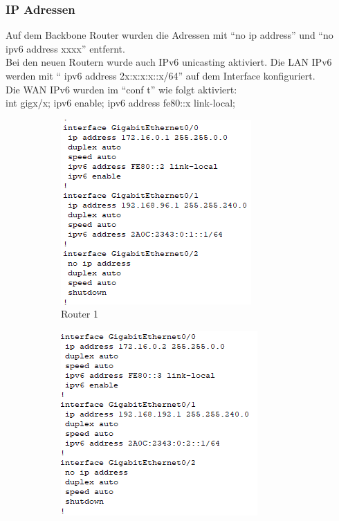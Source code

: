 \subsubsection{IP Adressen}
Auf dem Backbone Router wurden die Adressen mit ``no ip address'' und ``no ipv6 address xxxx'' entfernt.\\
Bei den neuen Routern wurde auch IPv6 unicasting aktiviert.
Die LAN IPv6 werden mit `` ipv6 address 2x:x:x:x::x/64'' auf dem Interface konfiguriert.\\
Die WAN IPv6 wurden im ``conf t'' wie folgt aktiviert:\\
int gigx/x; ipv6 enable; ipv6 address fe80::x link-local;
\begin{figure}[!htb]
    \centering
    \begin{subfigure}{.49\textwidth}
        \includegraphics[width=\textwidth,height=.75\textwidth,keepaspectratio]{./ip/router1.png}
        \caption{Router 1}
    \end{subfigure}
    \begin{subfigure}{.49\textwidth}
        \includegraphics[width=\textwidth,height=.75\textwidth,keepaspectratio]{./ip/router2.png}

\end{subfigure}
\end{figure}
